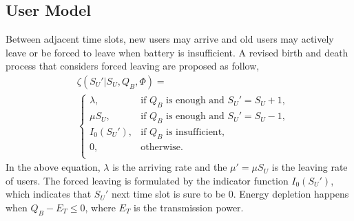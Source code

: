 \documentclass[conference]{IEEEtran}
\begin{document}
\subsection{User Model}
Between adjacent time slots, new users may arrive and
old users may actively leave or be forced to leave when battery is insufficient.
A revised birth and death process that considers forced leaving are proposed as follow,
\begin{align}\label{formula1}
&\zeta\left(S_U'| S_U, Q_B, \Phi\right) = \nonumber\\
&\begin{cases}
	\lambda, &\mbox{if $Q_B$ is enough and $S_U' = S_U + 1$,}\\
	\mu S_U, &\mbox{if $Q_B$ is enough and $S_U' = S_U - 1$,}\\
	I_0\left(S_U'\right), &\mbox{if $Q_B$ is insufficient,}\\
	0, &\mbox{otherwise.}\\
\end{cases}
\end{align}
In the above equation, \(\lambda\) is the arriving rate and
the \(\mu' = \mu S_U\) is the leaving rate of users.
The forced leaving is formulated by the indicator function \(I_0\left(S_U'\right)\),
which indicates that \(S_U'\) next time slot is sure to be \(0\).
Energy depletion happens when \(Q_B- E_T \leq 0\), where \(E_T\) is the transmission power.
\end{document}
